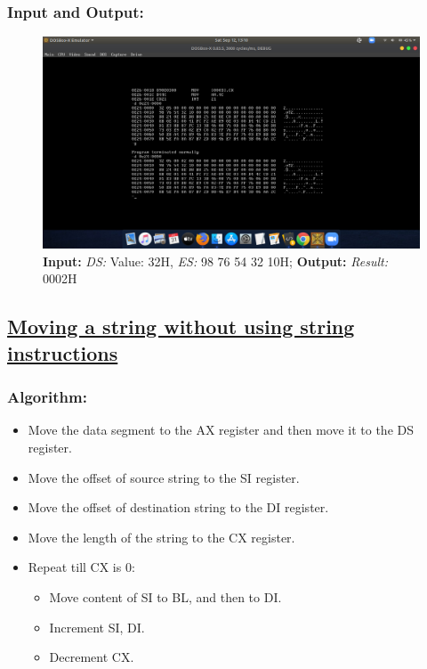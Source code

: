 \documentclass[12pt,a4paper]{article}
\begin{document}
\begin{flushleft}
\subsubsection*{\textbf{Input and Output:}}
\begin{figure}[h]
    \centering
    \includegraphics[trim = 100mm 60mm 100mm 80mm, clip, width = \textwidth]{Pics/StrscanIO.png}
    \caption{ \textbf{Input:} \emph{DS:} Value: 32H, \emph{ES:} 98 76 54 32 10H; \newline \hspace{1cm}
              \textbf{Output:} \emph{Result:} 0002H}
\end{figure}
\subsection*{\textbf{\underline{Moving a string without using string instructions}}}

\subsubsection*{\textbf{Algorithm:}}
\begin{itemize}
    \item Move the data segment to the AX register and then move it to the DS register.
    \item Move the offset of source string to the SI register.
    \item Move the offset of destination string to the DI register.
    \item Move the length of the string to the CX register. 
    \item Repeat till CX is 0:
    \begin{itemize}
        \item Move content of SI to BL, and then to DI.
        \item Increment SI, DI.
        \item Decrement CX.
    \end{itemize}
\end{itemize}


\end{flushleft}
\end{document}
